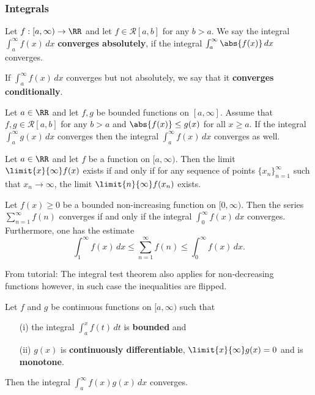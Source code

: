 \documentclass[12pt, a4paper]{article}
\begin{document}
\subsubsection{Integrals}

\begin{definition}
    Let \(f :[a,\infty) \to \RR\) and let \(f \in \mathcal{R}[a,b]\) for any \(b>a\). We say the integral \(\int_a^{\infty} f(x) \, dx\) \textbf{converges absolutely}, if the integral \(\int_a^{\infty} \abs{f(x)} \, dx\) converges.
\end{definition}

\begin{definition}
    If \(\int_a^{\infty} f(x) \, dx\) converges but not absolutely, we say that it \textbf{converges conditionally}.
\end{definition}

\begin{mdthm}
    Let \(a\in \RR\) and let \(f,g\) be bounded functions on \([a,\infty]\). Assume that \(f,g \in \mathcal{R}[a,b]\) for any \(b>a\) and \(\abs{f(x)} \leq g(x)\) for all \(x \geq a\). If the integral \(\int_a^{\infty} g(x) \, dx\) converges then the integral \(\int_a^{\infty} f(x) \, dx\) converges as well.
\end{mdthm}

\begin{lemma}
    Let \(a\in \RR\) and let \(f\) be a function on \([a,\infty)\). Then the limit \(\limit{x}{\infty} f(x)\) exists if and only if for any sequence of points \(\{x_n\}_{n=1}^{\infty}\) such that \(x_n \to \infty\), the limit \(\limit{n}{\infty} f(x_n)\) exists.
\end{lemma}

\begin{mdthm}
    Let \(f(x) \geq 0\) be a bounded non-increasing function on \([0,\infty)\). Then the series \(\sum_{n=1}^{\infty} f(n)\) converges if and only if the integral \(\int_0^{\infty} f(x) \, dx\) converges. Furthermore, one has the estimate
    \[\int_1^{\infty} f(x) \, dx \leq \sum_{n=1}^{\infty} f(n) \leq \int_0^{\infty} f(x) \, dx.\]
\end{mdthm}

\begin{mdnote}
    From tutorial: The integral test theorem also applies for non-decreasing \\ functions however, in such case the inequalities are flipped.
\end{mdnote}

\begin{mdthm}
    Let \(f\) and \(g\) be continuous functions on \([a,\infty)\) such that
    \begin{itemize}
        \item[(i)] the integral \(\int_a^x f(t) \, dt\) is \textbf{bounded} and
        \item[(ii)] \(g(x)\) is \textbf{continuously differentiable}, \(\limit{x}{\infty} g(x) =0\) and is \textbf{monotone}.
    \end{itemize}
    Then the integral \(\int_a^{\infty} f(x)g(x) \, dx\) converges.
\end{mdthm}
\end{document}

